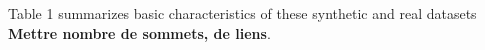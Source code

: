 Table 1 summarizes basic characteristics of these synthetic and real datasets \textbf{ Mettre nombre de sommets, de liens}.
%
%
%	
%
%
%	
%	
%
%
%
%
%
%
%
\clearpage
